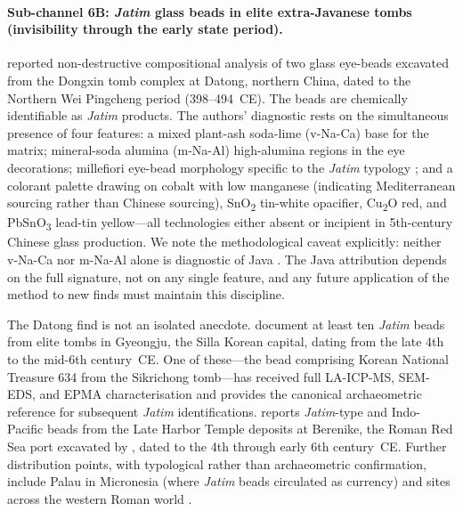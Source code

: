 \documentclass[12pt,a4paper]{article}
\begin{document}
\paragraph{Sub-channel 6B: \textit{Jatim} glass beads in elite extra-Javanese tombs (invisibility through the early state period).} \citet{jia_etal_2024} reported non-destructive compositional analysis of two glass eye-beads excavated from the Dongxin tomb complex at Datong, northern China, dated to the Northern Wei Pingcheng period (398--494~CE). The beads are chemically identifiable as \textit{Jatim} products. The authors' diagnostic rests on the simultaneous presence of four features: a mixed plant-ash soda-lime (v-Na-Ca) base for the matrix; mineral-soda alumina (m-Na-Al) high-alumina regions in the eye decorations; millefiori eye-bead morphology specific to the \textit{Jatim} typology \citep{lankton2008}; and a colorant palette drawing on cobalt with low manganese (indicating Mediterranean sourcing rather than Chinese sourcing), SnO\textsubscript{2} tin-white opacifier, Cu\textsubscript{2}O red, and PbSnO\textsubscript{3} lead-tin yellow---all technologies either absent or incipient in 5th-century Chinese glass production. We note the methodological caveat explicitly: neither v-Na-Ca nor m-Na-Al alone is diagnostic of Java \citep{jia_etal_2025,wang_etal_2023}. The Java attribution depends on the full signature, not on any single feature, and any future application of the method to new finds must maintain this discipline.

The Datong find is not an isolated anecdote. \citet{lankton_bernbaum} document at least ten \textit{Jatim} beads from elite tombs in Gyeongju, the Silla Korean capital, dating from the late 4th to the mid-6th century~CE. One of these---the bead comprising Korean National Treasure 634 from the Sikrichong tomb---has received full LA-ICP-MS, SEM-EDS, and EPMA characterisation and provides the canonical archaeometric reference for subsequent \textit{Jatim} identifications. \citet{then2014} reports \textit{Jatim}-type and Indo-Pacific beads from the Late Harbor Temple deposits at Berenike, the Roman Red Sea port excavated by \citet{sidebotham2011}, dated to the 4th through early 6th century~CE. Further distribution points, with typological rather than archaeometric confirmation, include Palau in Micronesia (where \textit{Jatim} beads circulated as currency) and sites across the western Roman world \citep{green2018}.
\end{document}

